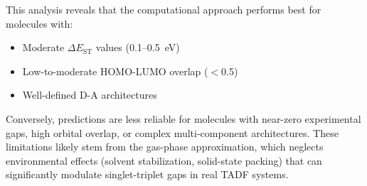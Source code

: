 This analysis reveals that the computational approach performs best for molecules with:
\begin{itemize}
    \item Moderate $\Delta E_{\mathrm{ST}}$ values (0.1--0.5~eV)
    \item Low-to-moderate HOMO-LUMO overlap ($<$0.5)
    \item Well-defined D-A architectures
\end{itemize}

Conversely, predictions are less reliable for molecules with near-zero experimental gaps, high orbital overlap, or complex multi-component architectures. These limitations likely stem from the gas-phase approximation, which neglects environmental effects (solvent stabilization, solid-state packing) that can significantly modulate singlet-triplet gaps in real TADF systems.
